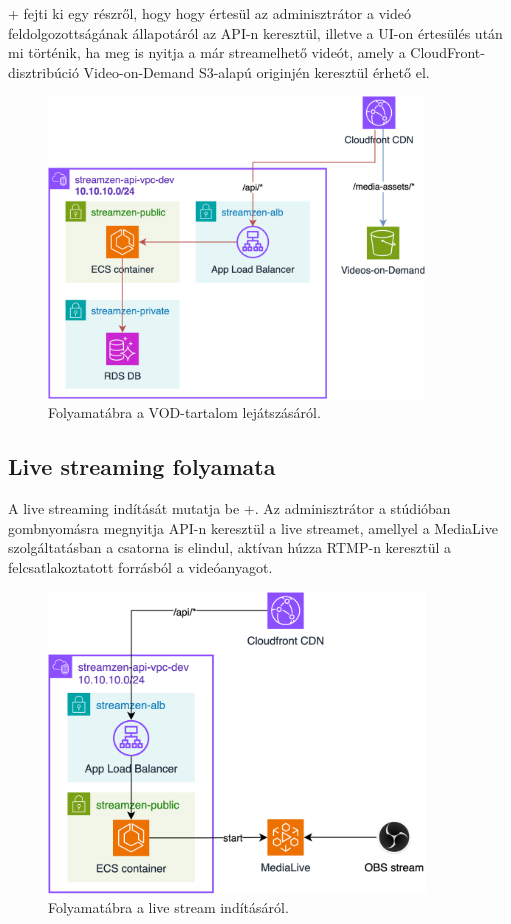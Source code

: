 \Az+ fejti ki egy részről, hogy hogy értesül az adminisztrátor a videó feldolgozottságának állapotáról az API-n keresztül, illetve a UI-on értesülés után mi történik, ha meg is nyitja a már streamelhető videót, amely a CloudFront-disztribúció Video-on-Demand S3-alapú originjén keresztül érhető el.

\begin{figure}[h]
	\centering
	\includegraphics[height=80mm, keepaspectratio]{figures/dipterv_vod3.png}
	\caption{Folyamatábra a VOD-tartalom lejátszásáról.}
	\label{fig:vod3}
\end{figure}

\subsection{Live streaming folyamata}

A live streaming indítását mutatja be \az+. Az adminisztrátor a stúdióban gombnyomásra megnyitja API-n keresztül a live streamet, amellyel a MediaLive szolgáltatásban a csatorna is elindul, aktívan húzza RTMP-n keresztül a felcsatlakoztatott forrásból a videóanyagot.

\begin{figure}[h]
	\centering
	\includegraphics[height=80mm, keepaspectratio]{figures/dipterv_live1.png}
	\caption{Folyamatábra a live stream indításáról.}
	\label{fig:live1}
\end{figure}


